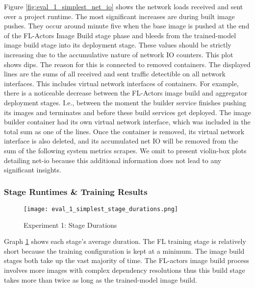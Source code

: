 Figure \ref{fig:eval_1_simplest_net_io} shows the network loads received and sent over a project runtime.
The most significant increases are during built image pushes.
They occur around minute five when the base image is pushed at the end of the FL-Actors Image Build stage phase and bleeds from the trained-model image build stage into its deployment stage.
These values should be strictly increasing due to the accumulative nature of network IO counters.
This plot shows dips.
The reason for this is connected to removed containers.
The displayed lines are the sums of all received and sent traffic detectible on all network interfaces.
This includes virtual network interfaces of containers.
For example, there is a noticeable decrease between the FL-Actors image build and aggregator deployment stages.
I.e., between the moment the builder service finishes pushing its images and terminates and before these build services get deployed.
The image builder container had its own virtual network interface, which was included in the total sum as one of the lines.
Once the container is removed, its virtual network interface is also deleted, and its accumulated net IO will be removed from the sum of the following system metrics scrapes.
We omit to present violin-box plots detailing net-io because this additional information does not lead to any significant insights.

\subsubsection{Stage Runtimes \& Training Results}

\begin{figure}[h]
    \begin{adjustwidth}{-0.2\paperwidth}{-0.2\paperwidth}
        \centering
        \texttt{[image: eval\_1\_simplest\_stage\_durations.png]}
        \caption{Experiment 1: Stage Durations}
        \label{fig:eval_1_simplest_stage_durations}
    \end{adjustwidth}
\end{figure}

Graph \ref{fig:eval_1_simplest_stage_durations} shows each stage's average duration.
The FL training stage is relatively short because the training configuration is kept at a minimum.
The image build stages both take up the vast majority of time.
The FL-actors image build process involves more images with complex dependency resolutions thus this build stage takes more than twice as long as the trained-model image build.

